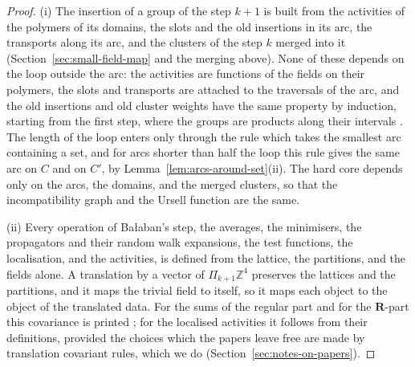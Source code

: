 \documentclass[11pt]{preprint}
\numberwithin{equation}{section}
\theoremstyle{definition}
\theoremstyle{remark}
\theoremstyle{plain}
\begin{document}
\begin{proof}
(i) The insertion of a group of the step $k + 1$ is built from the activities of the polymers of its domains, the slots and the old insertions in its arc, the transports along its arc, and the clusters of the step $k$ merged into it (Section~\ref{sec:small-field-map} and the merging above). None of these depends on the loop outside the arc: the activities are functions of the fields on their polymers, the slots and transports are attached to the traversals of the arc, and the old insertions and old cluster weights have the same property by induction, starting from the first step, where the groups are products along their intervals \cite[Definition~3.24]{WilsonFirstStep}. The length of the loop enters only through the rule which takes the smallest arc containing a set, and for arcs shorter than half the loop this rule gives the same arc on $C$ and on $C'$, by Lemma~\ref{lem:arcs-around-set}(ii). The hard core depends only on the arcs, the domains, and the merged clusters, so that the incompatibility graph and the Ursell function are the same.

(ii) Every operation of Ba{\l}aban's step, the averages, the minimisers, the propagators and their random walk expansions, the test functions, the localisation, and the activities, is defined from the lattice, the partitions, and the fields alone. A translation by a vector of $\Pi_{k+1}\mathbb Z^4$ preserves the lattices and the partitions, and it maps the trivial field to itself, so it maps each object to the object of the translated data. For the sums of the regular part and for the $\mathbf R$-part this covariance is printed \cite[(2.29), (2.32), p.~260]{BalabanCRE}; for the localised activities it follows from their definitions, provided the choices which the papers leave free are made by translation covariant rules, which we do (Section~\ref{sec:notes-on-papers}).
\end{proof}
\end{document}

